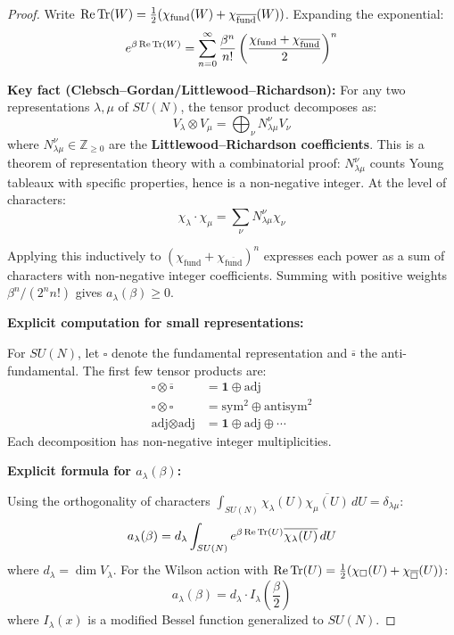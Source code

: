 \begin{proof}
Write $\operatorname{Re}\operatorname{Tr}(W) = \frac{1}{2}(\chi_{\text{fund}}(W) + \chi_{\overline{\text{fund}}}(W))$.
Expanding the exponential:
\[
e^{\beta \operatorname{Re}\operatorname{Tr}(W)} = \sum_{n=0}^\infty \frac{\beta^n}{n!} 
\left(\frac{\chi_{\text{fund}} + \chi_{\overline{\text{fund}}}}{2}\right)^n
\]

\textbf{Key fact (Clebsch--Gordan/Littlewood--Richardson):} For any two 
representations $\lambda, \mu$ of $SU(N)$, the tensor product decomposes as:
\[
V_\lambda \otimes V_\mu = \bigoplus_\nu N_{\lambda\mu}^\nu V_\nu
\]
where $N_{\lambda\mu}^\nu \in \mathbb{Z}_{\geq 0}$ are the \textbf{Littlewood--Richardson 
coefficients}. This is a theorem of representation theory with a combinatorial 
proof: $N_{\lambda\mu}^\nu$ counts Young tableaux with specific properties, 
hence is a non-negative integer. At the level of characters:
\[
\chi_\lambda \cdot \chi_\mu = \sum_\nu N_{\lambda\mu}^\nu \chi_\nu
\]

Applying this inductively to $(\chi_{\text{fund}} + \chi_{\overline{\text{fund}}})^n$ 
expresses each power as a sum of characters with non-negative integer coefficients.
Summing with positive weights $\beta^n/(2^n n!)$ gives $a_\lambda(\beta) \geq 0$.

\textbf{Explicit computation for small representations:}

For $SU(N)$, let $\square$ denote the fundamental representation and 
$\overline{\square}$ the anti-fundamental. The first few tensor products are:
\begin{align*}
\square \otimes \overline{\square} &= \mathbf{1} \oplus \text{adj} \\
\square \otimes \square &= \text{sym}^2 \oplus \text{antisym}^2 \\
\text{adj} \otimes \text{adj} &= \mathbf{1} \oplus \text{adj} \oplus \cdots
\end{align*}
Each decomposition has non-negative integer multiplicities.

\textbf{Explicit formula for $a_\lambda(\beta)$:}

Using the orthogonality of characters $\int_{SU(N)} \chi_\lambda(U) \overline{\chi_\mu(U)} \, dU = \delta_{\lambda\mu}$:
\[
a_\lambda(\beta) = d_\lambda \int_{SU(N)} e^{\beta \operatorname{Re}\operatorname{Tr}(U)} \overline{\chi_\lambda(U)} \, dU
\]
where $d_\lambda = \dim V_\lambda$. For the Wilson action with $\operatorname{Re}\operatorname{Tr}(U) = \frac{1}{2}(\chi_{\square}(U) + \chi_{\overline{\square}}(U))$:
\[
a_\lambda(\beta) = d_\lambda \cdot I_\lambda\left(\frac{\beta}{2}\right)
\]
where $I_\lambda(x)$ is a modified Bessel function generalized to $SU(N)$.


\end{proof}

